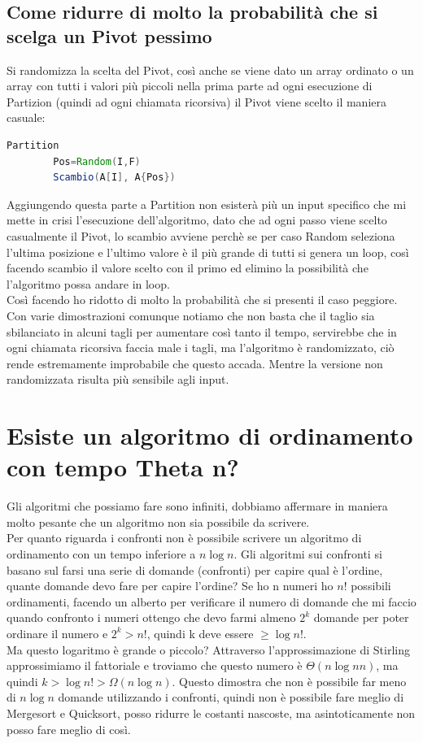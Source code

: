 \subsection{Come ridurre di molto la probabilità che si scelga un Pivot pessimo}
Si randomizza la scelta del Pivot, così anche se viene dato un array ordinato o un array
con tutti i valori più piccoli nella prima parte ad ogni esecuzione di Partizion (quindi
ad ogni chiamata ricorsiva) il Pivot viene scelto il maniera casuale:
\begin{lstlisting}[language=Java]
    Partition
        Pos=Random(I,F)
        Scambio(A[I], A{Pos})
\end{lstlisting}
Aggiungendo questa parte a Partition non esisterà più un input specifico che mi mette
in crisi l'esecuzione dell'algoritmo, dato che ad ogni passo viene scelto casualmente
il Pivot, lo scambio avviene perchè se per caso Random seleziona l'ultima posizione e l'ultimo
valore è il più grande di tutti si genera un loop, così facendo scambio il valore scelto con il
primo ed elimino la possibilità che l'algoritmo possa andare in loop.\\
Così facendo ho ridotto di molto la probabilità che si presenti il caso peggiore.\\
Con varie dimostrazioni comunque notiamo che non basta che il taglio sia sbilanciato in
alcuni tagli per aumentare così tanto il tempo, servirebbe che in ogni chiamata ricorsiva
faccia male i tagli, ma l'algoritmo è randomizzato, ciò rende estremamente improbabile che
questo accada. Mentre la versione non randomizzata risulta più sensibile agli input.\\

\section{Esiste un algoritmo di ordinamento con tempo Theta n?}
Gli algoritmi che possiamo fare sono infiniti, dobbiamo affermare in maniera molto
pesante che un algoritmo non sia possibile da scrivere.\\
Per quanto riguarda i confronti non è possibile scrivere un algoritmo di ordinamento
con un tempo inferiore a $n \log n$. Gli algoritmi sui confronti si basano sul farsi una serie
di domande (confronti) per capire qual è l'ordine, quante domande devo fare per capire 
l'ordine? Se ho n numeri ho $n!$ possibili ordinamenti, facendo un alberto per verificare
il numero di domande che mi faccio quando confronto i numeri ottengo che devo farmi almeno 
$2^k$ domande per poter ordinare il numero e $2^k > n!$, quindi k deve essere $\geq \log n !$.\\
Ma questo logaritmo è grande o piccolo? Attraverso l'approssimazione di Stirling approssimiamo il fattoriale
e troviamo che questo numero è $\Theta(n \log n n)$, ma quindi $k > \log n! > \Omega(n \log n)$.
Questo dimostra che non è possibile far meno di $n \log n$ domande utilizzando
i confronti, quindi non è possibile fare meglio di Mergesort e Quicksort, posso
ridurre le costanti nascoste, ma asintoticamente non posso fare meglio di così.\\
